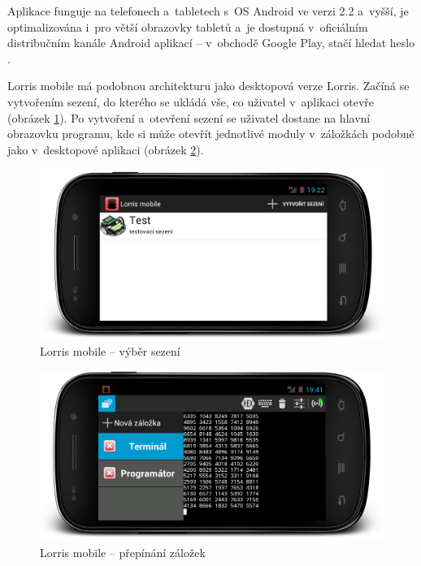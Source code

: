 \documentclass[12pt, a4paper, oneside]{article}
\begin{document}
Aplikace funguje na telefonech a~tabletech s~OS Android ve verzi 2.2 a~vyšší, je optimalizována i~pro větší obrazovky tabletů a~je dostupná v~oficiálním distribučním kanále Android aplikací -- v~obchodě Google Play\cite{gplay}, stačí hledat heslo .

Lorris mobile má podobnou architekturu jako desktopová verze Lorris. Začíná se vytvořením sezení, do kterého se ukládá vše, co uživatel v~aplikaci otevře (obrázek \ref{mobile_session}). Po vytvoření a~otevření sezení se uživatel dostane na hlavní obrazovku programu, kde si může otevřít jednotlivé moduly v~záložkách podobně jako v~desktopové aplikaci (obrázek \ref{mobile_tabs}).

\begin{figure}[H]
\begin{center}
\includegraphics[width=\textwidth]{img/mobile_session.png}
\caption{Lorris mobile -- výběr sezení}
\label{mobile_session}
\end{center}
\end{figure}
\begin{figure}[H]
\begin{center}
\includegraphics[width=\textwidth]{img/mobile_tabs.png}
\caption{Lorris mobile -- přepínání záložek}
\label{mobile_tabs}
\end{center}
\end{figure}
\end{document}
